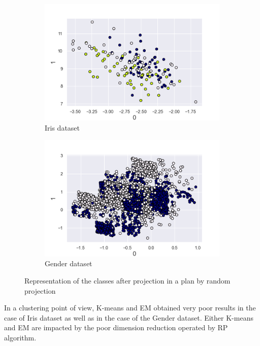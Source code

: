 \documentclass[twocolumn, 10pt]{article}
\begin{document}
			\begin{figure}[h]
				\centering
				\begin{subfigure}[t]{0.49\columnwidth}
					\centering
					\includegraphics[width=\linewidth]{../graphics/rnd_iris_0_1_label.png}
					\caption{Iris dataset}
					\label{fig:rnd_iris}
				\end{subfigure}
				\begin{subfigure}[t]{0.49\columnwidth}
					\centering
					\includegraphics[width=\linewidth]{../graphics/rnd_g_0_1_label.png}
					\caption{Gender dataset}
					\label{fig:rnd_g}
				\end{subfigure}
				\caption{Representation of the classes after projection in a plan by random projection}
				\label{fig:rnd}
			\end{figure}

			In a clustering point of view, K-means and EM obtained very poor results in the case of Iris dataset as well as in the case of the Gender dataset. Either K-means and EM are impacted by the poor dimension reduction operated by RP algorithm.
\end{document}
